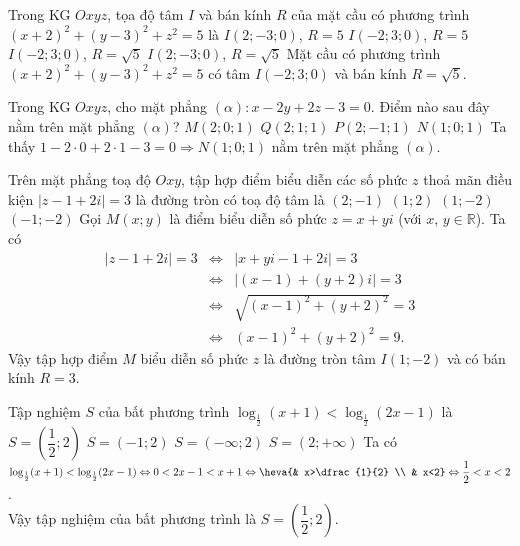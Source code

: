 \begin{ex}%
	Trong KG $Oxyz$, tọa độ tâm $I$ và bán kính $R$ của mặt cầu có phương trình $(x+2)^2+(y-3)^2+z^2=5$ là
	\choice
	{$I(2;-3;0)$, $R=5$}
	{$I(-2;3;0)$, $R=5$}
	{\True $I(-2;3;0)$, $R=\sqrt{5}$}
	{$I(2;-3;0)$, $R=\sqrt{5}$}
	\loigiai
	{
		Mặt cầu có phương trình $(x+2)^2+(y-3)^2+z^2=5$ có tâm $I(-2;3;0)$ và bán kính $R=\sqrt{5}$.
	}
\end{ex}

\begin{ex}%
	Trong KG $Oxyz$, cho mặt phẳng $(\alpha)\colon x-2y+2z-3=0$. Điểm nào sau đây nằm trên mặt phẳng $(\alpha)$?
	\choice
	{$M(2;0;1)$}
	{$Q(2;1;1)$}
	{$P(2;-1;1)$}
	{\True $N(1;0;1)$}
	\loigiai
	{
		Ta thấy $1-2\cdot 0+2\cdot 1-3=0\Rightarrow N(1;0;1)$ nằm trên mặt phẳng $(\alpha)$.
	}
\end{ex}

\begin{ex}%
	Trên mặt phẳng toạ độ $Oxy$, tập hợp điểm biểu diễn các số phức $z$ thoả mãn điều kiện $|z-1+2i|=3$ là đường tròn có toạ độ tâm là
	\choice
	{$(2;-1)$}
	{$(1;2)$}
	{\True $(1;-2)$}
	{$(-1;-2)$}
	\loigiai
	{
		Gọi $M(x;y)$ là điểm biểu diễn số phức $z=x+yi$ (với $x$, $y\in \mathbb{R}$). Ta có
		\begin{eqnarray*}
			|z-1+2i|=3&\Leftrightarrow &|x+yi-1+2i|=3\\
			&\Leftrightarrow &|(x-1)+(y+2)i|=3\\
			&\Leftrightarrow &\sqrt{(x-1)^2+(y+2)^2}=3\\
			&\Leftrightarrow &(x-1)^2+(y+2)^2=9.
		\end{eqnarray*}
		Vậy tập hợp điểm $M$ biểu diễn số phức $z$ là đường tròn tâm $I(1;-2)$ và có bán kính $R=3$.
	}
\end{ex}

\begin{ex}%
	Tập nghiệm $S$ của bất phương trình $\log_{\frac{1}{2}}(x+1)<\log_{\frac{1}{2}}(2x-1)$ là
	\choice
	{\True $S=\left(\dfrac{1}{2};2\right)$}
	{$S=(-1;2)$}
	{$S=(-\infty;2)$}
	{$S=(2;+\infty)$}
	\loigiai
	{
		Ta có $\log_{\frac{1}{2}}(x+1)<\log_{\frac{1}{2}}(2x-1)\Leftrightarrow 0<2x-1<x+1\Leftrightarrow \heva{& x>\dfrac{1}{2} \\ & x<2}\Leftrightarrow \dfrac{1}{2}<x<2$.\\
		Vậy tập nghiệm của bất phương trình là $S=\left(\dfrac{1}{2};2\right)$.
	}
\end{ex}

